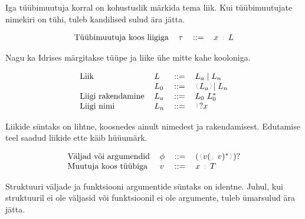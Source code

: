 \documentclass[12pt]{article}
\begin{document}
    Iga tüübimuutuja korral on kohustuslik märkida tema liik. Kui tüübimuutujate nimekiri on tühi, tuleb kandilised sulud ära jätta.

    \begin{equation*}
      \begin{tabular}{llll}
        Tüübimuutuja koos liigiga & $\tau$ & $::=$ & $x$ {\color{helehall}\verb!:!} $L$
      \end{tabular}
    \end{equation*}

    Nagu ka Idrises märgitakse tüüpe ja liike ühe mitte kahe kooloniga.

    \begin{equation*}
      \begin{tabular}{llll}
        Liik              & $L$   & $::=$ & $L_a\mid L_n$                                                       \\
                          & $L_0$ & $::=$ & {\color{helehall}\verb!(!}$L_a${\color{helehall}\verb!)!}$\mid L_n$ \\
        Liigi rakendamine & $L_a$ & $::=$ & $L_0$ $L_0^*$                                                       \\
        Liigi nimi        & $L_n$ & $::=$ & {\color{helehall}\verb"!"}$?x$
      \end{tabular}
    \end{equation*}

    Liikide süntaks on lihtne, koosnedes ainult nimedest ja rakendamisest. Edutamise teel saadud liikide ette käib hüüumärk.

    \begin{equation*}
      \begin{tabular}{llll}
        Väljad või argumendid & $\phi$ & $::=$ & $(${\color{helehall}\verb!(!}$v(${\color{helehall}\verb!,!} $v)^*${\color{helehall}\verb!)!}$)?$ \\
        Muutuja koos tüübiga  & $v$    & $::=$ & $x$ {\color{helehall}\verb!:!} $T$
      \end{tabular}
    \end{equation*}

    Struktuuri väljade ja funktsiooni argumentide süntaks on identne. Juhul, kui struktuuril ei ole väljasid või funktsioonil ei ole argumente, tuleb ümarsulud ära jätta.
\end{document}
